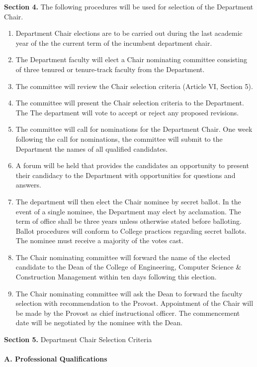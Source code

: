 \documentclass{scrartcl}
\begin{document}
\textbf{Section 4.} The following procedures will be used for selection of the Department Chair.
\begin{enumerate}
\item Department Chair elections are to be carried out during the last academic year of the the current term of the incumbent department chair.
\item The Department faculty will elect a Chair nominating committee consisting of three tenured or tenure-track faculty from the Department.
\item The committee will review the Chair selection criteria (Article VI, Section 5).
\item The committee will present the Chair selection criteria to the Department. The The department will vote to accept or reject any proposed revisions.
\item The committee will call for nominations for the Department Chair. One week following the call for nominations, the committee will submit to the Department the names of all qualified candidates.
\item A forum will be held that provides the candidates an opportunity to present their candidacy to the Department with opportunities for questions and answers.
\item The department will then elect the Chair nominee by secret ballot. In the event of a single nominee, the Department may elect by acclamation. The term of office shall be three years unless otherwise stated before balloting. Ballot procedures will conform to College practices regarding secret ballots. The nominee must receive a majority of the votes cast.
\item The Chair nominating committee will forward the name of the elected candidate to the Dean of the College of Engineering, Computer Science \& Construction Management within ten days following this election.
\item The Chair nominating committee will ask the Dean to forward the faculty selection with recommendation to the Provost. Appointment of the Chair will be made by the Provost as chief instructional officer. The commencement date will be negotiated by the nominee with the Dean.
\end{enumerate}

\textbf{Section 5.} Department Chair Selection Criteria
\paragraph{A. Professional Qualifications}
\end{document}
